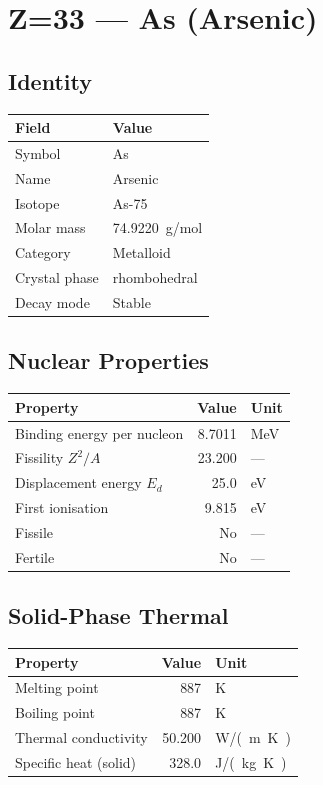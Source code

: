 \documentclass[11pt,a4paper]{article}
\begin{document}
\newpage

\section{Z=33 --- As (Arsenic)}
\label{sec:Z33}

\subsection{Identity}
\begin{tabular}{ll}
  \toprule
  Field & Value \\
  \midrule
  Symbol & As \\
  Name & Arsenic \\
  Isotope & As-75 \\
  Molar mass & \SI{74.9220}{g/mol} \\
  Category & Metalloid \\
  Crystal phase & rhombohedral \\
  Decay mode & Stable \\
  \bottomrule
\end{tabular}

\subsection{Nuclear Properties}
\begin{tabular}{lrl}
  \toprule
  Property & Value & Unit \\
  \midrule
  Binding energy per nucleon & 8.7011 & \si{MeV} \\
  Fissility $Z^2/A$ & 23.200 & --- \\
  Displacement energy $E_d$ & 25.0 & \si{eV} \\
  First ionisation & 9.815 & \si{eV} \\
  Fissile & No & --- \\
  Fertile & No & --- \\
  \bottomrule
\end{tabular}

\subsection{Solid-Phase Thermal}
\begin{tabular}{lrl}
  \toprule
  Property & Value & Unit \\
  \midrule
  Melting point & 887 & \si{K} \\
  Boiling point & 887 & \si{K} \\
  Thermal conductivity & 50.200 & \si{W/(m.K)} \\
  Specific heat (solid) & 328.0 & \si{J/(kg.K)} \\
  \bottomrule
\end{tabular}
\end{document}
